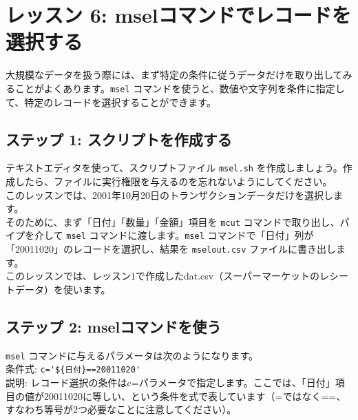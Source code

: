 

%

\section{レッスン 6: mselコマンドでレコードを選択する}

大規模なデータを扱う際には、まず特定の条件に従うデータだけを取り出してみることがよくあります。\verb|msel| コマンドを使うと、数値や文字列を条件に指定して、特定のレコードを選択することができます。

\subsection{ステップ 1: スクリプトを作成する}

テキストエディタを使って、スクリプトファイル \verb|msel.sh| を作成しましょう。作成したら、ファイルに実行権限を与えるのを忘れないようにしてください。\\

このレッスンでは、2001年10月20日のトランザクションデータだけを選択します。\\

そのために、まず「日付」「数量」「金額」項目を \verb|mcut| コマンドで取り出し、パイプを介して \verb|msel| コマンドに渡します。\verb|msel| コマンドで「日付」列が「20011020」のレコードを選択し、結果を \verb|mselout.csv| ファイルに書き出します。\\

このレッスンでは、レッスン1で作成したdat.csv（スーパーマーケットのレシートデータ）を使います。

\subsection{ステップ 2: mselコマンドを使う}
 
{\setlength{\parindent}{0cm}
\verb|msel| コマンドに与えるパラメータは次のようになります。\\

条件式: \verb|c='${日付}==20011020'| \\
説明: レコード選択の条件はc=パラメータで指定します。ここでは、「日付」項目の値が20011020に等しい、という条件を式で表しています（=ではなく==、すなわち等号が2つ必要なことに注意してください）。\\
}

